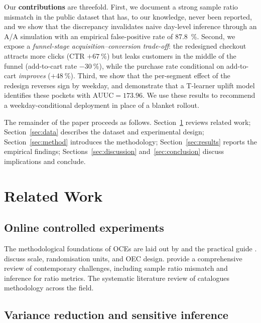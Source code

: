\documentclass[pdflatex,sn-mathphys-num]{sn-jnl}
\theoremstyle{thmstyleone}
\theoremstyle{thmstyletwo}
\theoremstyle{thmstylethree}
\begin{document}
Our \textbf{contributions} are threefold.
First, we document a strong sample ratio mismatch in the public dataset that has, to our knowledge,
never been reported, and we show that the discrepancy invalidates naive day-level inference
through an A/A simulation with an empirical false-positive rate of \SI{87.8}{\percent}.
Second, we expose a \emph{funnel-stage acquisition--conversion trade-off}: the redesigned
checkout attracts more clicks (CTR $+\SI{67}{\percent}$) but leaks customers in the middle of the funnel
(add-to-cart rate $-\SI{30}{\percent}$), while the purchase rate conditional on add-to-cart
\emph{improves} ($+\SI{48}{\percent}$).
Third, we show that the per-segment effect of the redesign reverses sign by weekday,
and demonstrate that a T-learner uplift model identifies these pockets with
$\mathrm{AUUC}=173.96$. We use these results to recommend a weekday-conditional
deployment in place of a blanket rollout.

The remainder of the paper proceeds as follows.
Section~\ref{sec:related} reviews related work; Section~\ref{sec:data} describes the
dataset and experimental design; Section~\ref{sec:method} introduces the methodology;
Section~\ref{sec:results} reports the empirical findings; Sections~\ref{sec:discussion}
and~\ref{sec:conclusion} discuss implications and conclude.

\section{Related Work}\label{sec:related}

\subsection{Online controlled experiments}\label{subsec:oce}

The methodological foundations of OCEs are laid out by \cite{kohavi2009controlled}
and the practical guide \cite{kohavi2020trustworthy}.
\cite{kohavi2013online} discuss scale, randomisation units, and OEC design.
\cite{larsen2024statistical} provide a comprehensive review of contemporary challenges,
including sample ratio mismatch and inference for ratio metrics.
The systematic literature review of \cite{quin2024ab} catalogues methodology across the field.

\subsection{Variance reduction and sensitive inference}\label{subsec:cuped}
\end{document}
